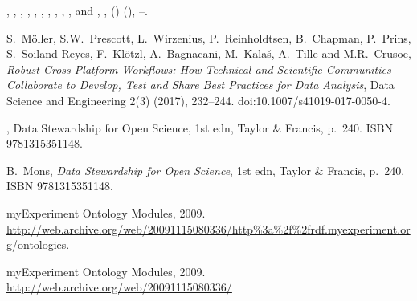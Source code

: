 \documentclass[ds,v1.1.2,openaccess]{iosart2x}%
\begin{document}
\begin{thebibliography}{}
%
\begin{barticle}
,
,
,
,
,
,
,
,
,
,
 and
,
,
()
(),
--.
\end{barticle}
%
\OrigBibText
S.~M\"{o}ller,
S.W.~Prescott,
L.~Wirzenius,
P.~Reinholdtsen,
B.~Chapman,
P.~Prins,
S.~Soiland-Reyes,
F.~Kl\"{o}tzl,
A.~Bagnacani,
M.~Kala\v{s},
A.~Tille and
M.R.~Crusoe,
\textit{Robust Cross-Platform Workflows: How Technical and Scientific
Communities Collaborate to Develop, Test and Share Best Practices for Data
Analysis},
Data Science and Engineering
2(3)
(2017),
232--244.
doi:10.1007/s41019-017-0050-4.
\endOrigBibText
{}
\endbibitem

%
\begin{botherref}
,
Data Stewardship for Open Science,
1st edn,
Taylor \& Francis,
p.~240.
ISBN 9781315351148.
\end{botherref}
%
\OrigBibText
B.~Mons,
\textit{Data Stewardship for Open Science},
1st edn,
Taylor \& Francis,
p.~240.
ISBN 9781315351148.
\endOrigBibText
{}
\endbibitem

%
\begin{botherref}
{{myExperiment Ontology Modules}},
2009.
\url{http://web.archive.org/web/20091115080336/http\%3a\%2f\%2frdf.myexperiment.org/ontologies}.
\end{botherref}
%
\OrigBibText
{myExperiment} Ontology Modules,
2009.
\url{http://web.archive.org/web/20091115080336/}
\endOrigBibText
{}
\endbibitem


\end{thebibliography}
\end{document}
